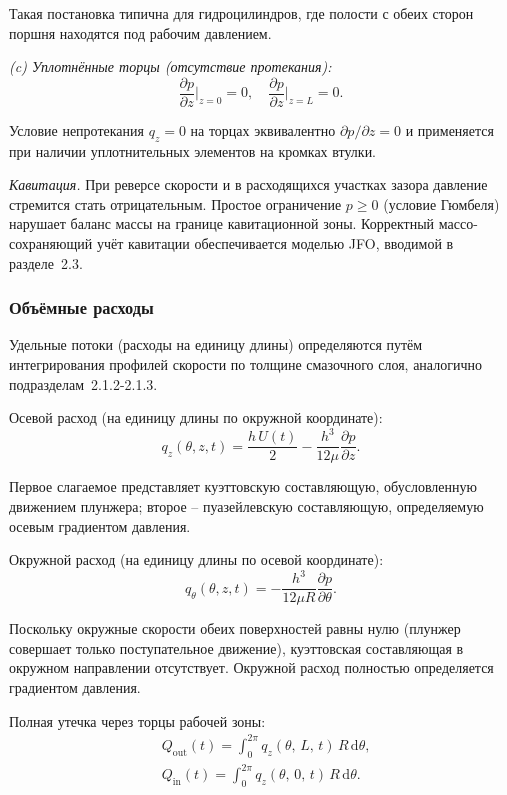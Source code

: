 Такая постановка типична для гидроцилиндров, где полости с обеих сторон поршня находятся под рабочим давлением.

\textit{(c) Уплотнённые торцы (отсутствие протекания):}
\begin{equation}
\frac{\partial p}{\partial z}\bigg|_{z=0} = 0, \quad
\frac{\partial p}{\partial z}\bigg|_{z=L} = 0.
\label{eq:recip_bc_sealed}
\end{equation}

Условие непротекания $q_z = 0$ на торцах эквивалентно $\partial p/\partial z = 0$ и применяется при наличии уплотнительных элементов на кромках втулки.

\textit{Кавитация.} При реверсе скорости и в расходящихся участках зазора давление стремится стать отрицательным. Простое ограничение $p \geq 0$ (условие Гюмбеля) нарушает баланс массы на границе кавитационной зоны. Корректный массо-сохраняющий учёт кавитации обеспечивается моделью JFO, вводимой в разделе~2.3.


\subsubsection*{Объёмные расходы}

Удельные потоки (расходы на единицу длины) определяются путём интегрирования профилей скорости по толщине смазочного слоя, аналогично подразделам~2.1.2-2.1.3.

Осевой расход (на единицу длины по окружной координате):
\begin{equation}
q_z(\theta, z, t) = \frac{h\,U(t)}{2}
  - \frac{h^3}{12\mu}\frac{\partial p}{\partial z}.
\label{eq:recip_q_z}
\end{equation}

Первое слагаемое представляет куэттовскую составляющую, обусловленную движением плунжера; второе -- пуазейлевскую составляющую, определяемую осевым градиентом давления.

Окружной расход (на единицу длины по осевой координате):
\begin{equation}
q_\theta(\theta, z, t) = -\frac{h^3}{12\mu R}\frac{\partial p}{\partial\theta}.
\label{eq:recip_q_theta}
\end{equation}

Поскольку окружные скорости обеих поверхностей равны нулю (плунжер совершает только поступательное движение), куэттовская составляющая в окружном направлении отсутствует. Окружной расход полностью определяется градиентом давления.

Полная утечка через торцы рабочей зоны:
\begin{equation}
\label{eq:recip_Q_leakage}
\begin{split}
&Q_{\mathrm{out}}(t) = \int_0^{2\pi} q_z(\theta,\,L,\,t)\,R\,\mathrm{d}\theta, \\
&Q_{\mathrm{in}}(t) = \int_0^{2\pi} q_z(\theta,\,0,\,t)\,R\,\mathrm{d}\theta.
\end{split}
\end{equation}

